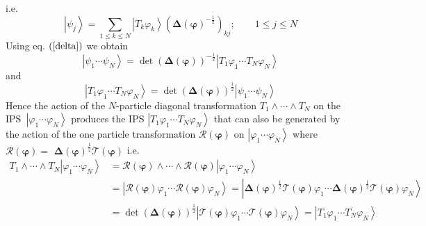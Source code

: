 \documentclass[aps,preprint]{revtex4}%
\begin{document}
i.e.%
\begin{equation}
\left\vert \psi_{j}\right\rangle =%
{\textstyle\sum\limits_{1\leq k\leq N}}
\left\vert T_{k}\varphi_{k}\right\rangle \left(  \mathbf{\Delta}\left(
\mathbf{\varphi}\right)  ^{-\frac{1}{2}}\right)  _{kj};\qquad1\leq j\leq N
\end{equation}
Using eq. $\left(  \ref{delta}\right)  $ we obtain
\begin{equation}
\left\vert \psi_{1}\cdots\psi_{N}\right\rangle =\det\left(  \mathbf{\Delta
}\left(  \mathbf{\varphi}\right)  \right)  ^{-\frac{1}{2}}\left\vert
T_{1}\varphi_{1}\cdots T_{N}\varphi_{N}\right\rangle
\end{equation}
and
\begin{equation}
\left\vert T_{1}\varphi_{1}\cdots T_{N}\varphi_{N}\right\rangle =\det\left(
\mathbf{\Delta}\left(  \mathbf{\varphi}\right)  \right)  ^{\frac{1}{2}%
}\left\vert \psi_{1}\cdots\psi_{N}\right\rangle
\end{equation}
Hence the action of the $N$-particle diagonal transformation $T_{1}%
\wedge\cdots\wedge T_{N}$ on the IPS\ $\left\vert \varphi_{1}\cdots\varphi
_{N}\right\rangle $ produces the IPS $\left\vert T_{1}\varphi_{1}\cdots
T_{N}\varphi_{N}\right\rangle $ that can also be generated by the action of
the one particle transformation $\mathcal{R}\left(  \mathbf{\varphi}\right)  $
on $\left\vert \varphi_{1}\cdots\varphi_{N}\right\rangle $ where
$\mathcal{R}\left(  \mathbf{\varphi}\right)  =$ $\mathbf{\Delta}\left(
\mathbf{\varphi}\right)  ^{\frac{1}{2}}\mathcal{T}\left(  \mathbf{\varphi
}\right)  $ i.e.
\begin{align}
T_{1}\wedge\cdots\wedge T_{N}\left\vert \varphi_{1}\cdots\varphi
_{N}\right\rangle  &  =\mathcal{R}\left(  \mathbf{\varphi}\right)
\wedge\cdots\wedge\mathcal{R}\left(  \mathbf{\varphi}\right)  \left\vert
\varphi_{1}\cdots\varphi_{N}\right\rangle \nonumber\\
&  =\left\vert \mathcal{R}\left(  \mathbf{\varphi}\right)  \varphi_{1}%
\cdots\mathcal{R}\left(  \mathbf{\varphi}\right)  \varphi_{N}\right\rangle
=\left\vert \mathbf{\Delta}\left(  \mathbf{\varphi}\right)  ^{\frac{1}{2}%
}\mathcal{T}\left(  \mathbf{\varphi}\right)  \varphi_{1}\cdots\mathbf{\Delta
}\left(  \mathbf{\varphi}\right)  ^{\frac{1}{2}}\mathcal{T}\left(
\mathbf{\varphi}\right)  \varphi_{N}\right\rangle \nonumber\\
&  =\det\left(  \mathbf{\Delta}\left(  \mathbf{\varphi}\right)  \right)
^{\frac{1}{2}}\left\vert \mathcal{T}\left(  \mathbf{\varphi}\right)
\varphi_{1}\cdots\mathcal{T}\left(  \mathbf{\varphi}\right)  \varphi
_{N}\right\rangle =\left\vert T_{1}\varphi_{1}\cdots T_{N}\varphi
_{N}\right\rangle
\end{align}
\end{document}
